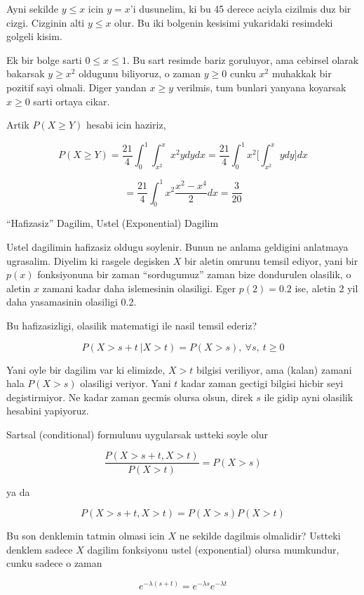 \documentclass[12pt,fleqn]{article}\usepackage{../common}
\begin{document}
Ayni sekilde $y \le x$ icin $y = x$'i dusunelim, ki bu 45 derece aciyla
cizilmis duz bir cizgi. Cizginin alti $y \le x$ olur. Bu iki bolgenin
kesisimi yukaridaki resimdeki golgeli kisim. 

Ek bir bolge sarti $0 \le x \le 1$. Bu sart resimde bariz goruluyor, ama
cebirsel olarak bakarsak $y \ge x^2$ oldugunu biliyoruz, o zaman $y \ge 0$
cunku $x^2$ muhakkak bir pozitif sayi olmali. Diger yandan $x \ge y$
verilmis, tum bunlari yanyana koyarsak $x \ge 0$ sarti ortaya cikar. 

Artik $P(X \ge Y)$ hesabi icin haziriz, 

\[ P(X \ge Y) = 
\frac{ 21}{4} \int_{ 0}^{1} \int _{ x^2}^{x} x^2y dy dx = 
\frac{ 21}{4} \int_{ 0}^{1} x^2 \bigg[ \int _{ x^2}^{x} y dy \bigg] dx 
 \]

\[ = \frac{ 21}{4} \int _{ 0}^{1} x^2 \frac{ x^2 - x^4}{2} dx = \frac{ 3}{20} \]


``Hafizasiz'' Dagilim, Ustel (Exponential) Dagilim

Ustel dagilimin hafizasiz oldugu soylenir. Bunun ne anlama geldigini
anlatmaya ugrasalim. Diyelim ki rasgele degisken $X$ bir aletin omrunu
temsil ediyor, yani bir $p(x)$ fonksiyonuna bir zaman ``sordugumuz'' zaman
bize dondurulen olasilik, o aletin $x$ zamani kadar daha islemesinin
olasiligi. Eger $p(2) = 0.2$ ise, aletin 2 yil daha yasamasinin olasiligi
0.2. 

Bu hafizasizligi, olasilik matematigi ile nasil temsil ederiz?

\[ P( X>s+t \ | X>t ) =  P(X>s) , \ \forall s, \ t \ge 0 \]

Yani oyle bir dagilim var ki elimizde, $X>t$ bilgisi veriliyor, ama (kalan)
zamani hala $P(X>s)$ olasiligi veriyor. Yani $t$ kadar zaman gectigi 
bilgisi hicbir seyi degistirmiyor. Ne kadar zaman gecmis olursa olsun,
direk $s$ ile gidip ayni olasilik hesabini yapiyoruz. 

Sartsal (conditional) formulunu uygularsak ustteki soyle olur

\[  \frac{P( X>s+t,  X>t )}{P(X>t)} = P(X>s)  \]

ya da

\[  P( X>s+t,  X>t ) = P(X>s)P(X>t) \]

Bu son denklemin tatmin olmasi icin $X$ ne sekilde dagilmis olmalidir?
Ustteki denklem sadece $X$ dagilim fonksiyonu ustel (exponential) olursa
mumkundur, cunku sadece o zaman

\[ e^{-\lambda(s+t)}  = e^{-\lambda s} e^{-\lambda t}\]
\end{document}
